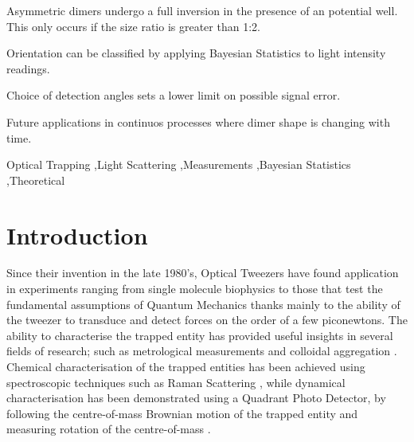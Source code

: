 \documentclass[final, 3p]{elsarticle}
\begin{document}
\begin{frontmatter}
\begin{highlights}
\item Asymmetric dimers undergo a full inversion in the presence of an potential well. This only occurs if the size ratio is greater than 1:2.  
\item Orientation can be classified by applying Bayesian Statistics to light intensity readings. 
\item Choice of detection angles sets a lower limit on possible signal error. 
\item Future applications in continuos processes where dimer shape is changing with time.   
\end{highlights}

\begin{keyword}
	Optical Trapping \sep Light Scattering \sep Measurements \sep Bayesian Statistics \sep Theoretical 
\end{keyword}

\end{frontmatter}


\section{Introduction}
\label{sec:Intro}

Since their invention in the late 1980's, Optical Tweezers have found application in experiments ranging from single molecule biophysics \cite{Bustamante2021Biophysics} to those that test the fundamental assumptions of Quantum Mechanics \cite{yin2013large} thanks mainly to the ability of the tweezer to transduce and detect forces on the order of a few piconewtons. The ability to characterise the trapped entity has provided useful insights in several fields of research; such as metrological measurements \cite{arita2020coherent} and colloidal aggregation \cite{burns1990optical}. Chemical characterisation of the trapped entities has been achieved using spectroscopic techniques such as Raman Scattering \cite{gupta2014raman}, while dynamical characterisation has been demonstrated using a Quadrant Photo Detector,  by following the centre-of-mass Brownian motion of the trapped entity  \cite{friedrich2012tuning} and measuring rotation  of the centre-of-mass \cite{yifat2021facile}. 
\end{document}
